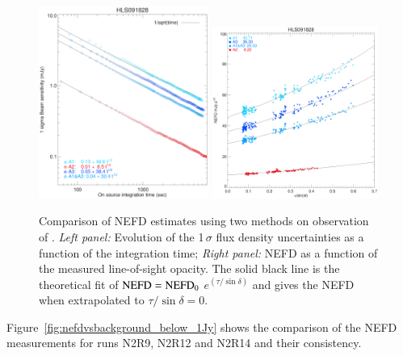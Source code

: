 \begin{figure}[!thbp]
  \begin{center}
    \includegraphics[trim={0.5cm, 0.5cm, 1.5cm, 1.8cm}, clip, angle=0, width=0.495\textwidth]{Figures/hls_nefd_vst.eps}
    \includegraphics[trim={0.5cm, 0, 0.2cm, 0.5cm}, clip, angle=0, width=0.485\textwidth]{Figures/hls_NEFD_vs_TauElev_all.eps}
    \caption{Comparison of NEFD estimates using two methods on
      observation of \hls. \emph{Left panel:} Evolution of the 1\,$\sigma$ flux density uncertainties as a function of the integration time; \emph{Right panel:} NEFD as a function of the measured line-of-sight opacity. The solid black line is the theoretical fit of $\rm{NEFD} = \rm{NEFD}_0$ $e^{(\tau/\sin\delta)}$ and gives the NEFD when extrapolated to $\tau/\sin\delta = 0$.}
    \label{fig:nefd_twomethods}
  \end{center}
\end{figure}


Figure~\ref{fig:nefdvsbackground_below_1Jy} shows the comparison of
the NEFD measurements for runs N2R9, N2R12 and N2R14 and their
consistency.

